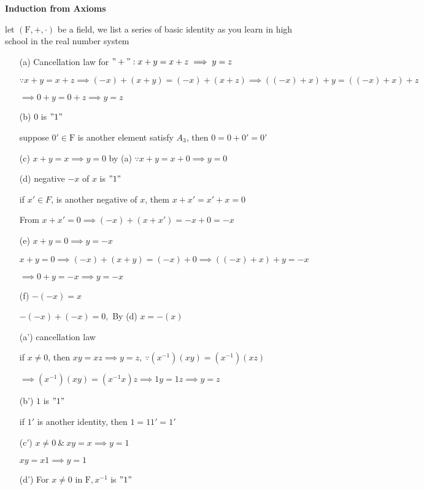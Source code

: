 \textbf{Induction from Axioms}

let $(\mathrm{F},+,\cdot)$ be a field, we list a series of basic identity as you learn in high school in the real number system

\begin{enumerate}
	\item[(a)] Cancellation law for $"+":x+y = x+z \implies y = z$
	
	$\because x+y = x+z \implies (-x)+(x+y)=(-x)+(x+z) \implies ((-x)+x)+y = ((-x)+x)+z$
	
	$\implies 0+y = 0+z \implies y=z$
	
	\item[(b)] $0$ is $"1"$
	
	suppose $0' \in \mathrm{F}$ is another element satisfy $A_3$, then $0 = 0+0'=0'$
	\item[(c)] $x+y = x \implies y = 0$ by (a) $\because x+y = x+0 \implies y=0$
	
	\item[(d)] negative $-x$ of $x$ is $"1"$
	
	if $x' \in F$, is another negative of $x$, them $x+x' = x'+x = 0$
	
	From $x + x' = 0 \implies (-x)+(x + x')=-x+0=-x$
	
	\item[(e)] $x+y = 0 \implies y = -x$
	
	$x +y=0 \implies (-x)+(x+y) = (-x)+0 \implies ((-x)+x)+y = -x $
	
	$\implies 0+y = -x \implies y = -x$
	
	\item[(f)] $-(-x) = x $
	
	$-(-x)+(-x) = 0,$ By (d) $x = -(x)$
	
	\item[(a')]cancellation law
	
	if $x \neq 0$, then $xy = xz \implies y = z,~\because (x^{-1})(xy) = (x^{-1})(xz)$
	
	$\implies (x^{-1})(xy) = (x^{-1}x)z \implies 1y = 1z \implies y = z$
	\item[(b')]$1$ is $"1"$
	
	if $1'$ is another identity, then $1 = 11' = 1'$
	
	\item[(c')] $x \neq 0 ~\&~ xy = x \implies y = 1$
	
	$xy = x1 \implies y = 1$
	
	\item[(d')]For $x \neq 0$ in $\mathrm{F}, x^{-1}$ is $"1"$
	

\end{enumerate}

